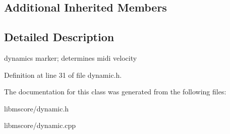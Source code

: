 \subsection*{Additional Inherited Members}


\subsection{Detailed Description}
dynamics marker; determines midi velocity 

Definition at line 31 of file dynamic.\+h.



The documentation for this class was generated from the following files\+:\begin{DoxyCompactItemize}
\item 
libmscore/dynamic.\+h\item 
libmscore/dynamic.\+cpp\end{DoxyCompactItemize}
